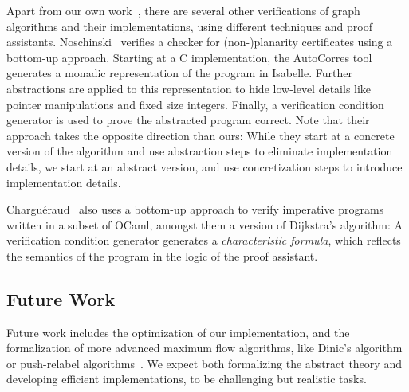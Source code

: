 \documentclass{llncs}
\begin{document}
  Apart from our own work~\cite{La14,NoLa12}, there are several other verifications of graph algorithms and their implementations, using different techniques and proof assistants. Noschinski~\cite{Nosch15} verifies a checker for (non-)planarity certificates using a bottom-up approach. Starting at a C implementation,
  the AutoCorres tool~\cite{Greenaway15,GAK12} generates a monadic representation of the program in Isabelle. Further abstractions are applied
  to this representation to hide low-level details like pointer manipulations and fixed size integers. Finally, a verification condition
  generator is used to prove the abstracted program correct. Note that their approach takes the opposite direction than ours: While they start at a concrete version of the algorithm and use abstraction steps to eliminate implementation details, we start at an abstract version, and use concretization steps to introduce implementation details.

  Chargu\'eraud~\cite{char11} also uses a bottom-up approach to verify imperative programs written in a subset of OCaml, amongst them a version of Dijkstra's algorithm:
  A verification condition generator generates a \emph{characteristic formula}, which reflects the semantics of the program in the logic of the proof assistant.
  
  \subsection{Future Work}
  Future work includes the optimization of our implementation, and the formalization of more advanced maximum flow algorithms, like Dinic's algorithm~\cite{Di06} or push-relabel algorithms~\cite{GoTa88}.
  We expect both formalizing the abstract theory and developing efficient implementations, to be challenging but realistic tasks.
  
\end{document}
